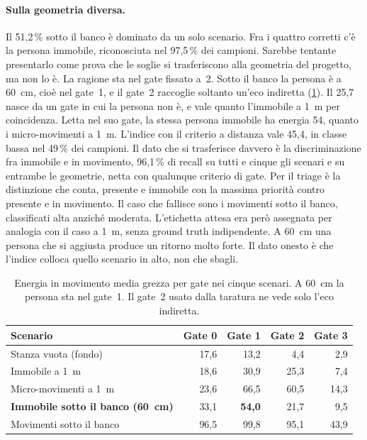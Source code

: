 \paragraph{Sulla geometria diversa.} Il 51,2\,\% sotto il banco è dominato da un
solo scenario. Fra i quattro corretti c'è la persona immobile, riconosciuta nel
97,5\,\% dei campioni. Sarebbe tentante presentarlo come prova che le soglie si
trasferiscono alla geometria del progetto, ma non lo è. La ragione sta nel gate
fissato a~2. Sotto il banco la persona è a 60~cm, cioè nel gate~1, e il gate~2
raccoglie soltanto un'eco indiretta (\cref{tab:vitalita-gate}). Il 25,7 nasce da un
gate in cui la persona non è, e vale quanto l'immobile a 1~m per coincidenza. Letta
nel suo gate, la stessa persona immobile ha energia 54, quanto i micro-movimenti a
1~m. L'indice con il criterio a distanza vale 45,4, in classe bassa nel 49\,\% dei
campioni. Il dato che si trasferisce davvero è la discriminazione fra immobile e in
movimento, 96,1\,\% di recall su tutti e cinque gli scenari e su entrambe le
geometrie, netta con qualunque criterio di gate. Per il triage è la distinzione che
conta, presente e immobile con la massima priorità contro presente e in movimento.
Il caso che fallisce sono i movimenti sotto il banco, classificati alta anziché
moderata. L'etichetta attesa era però assegnata per analogia con il caso a 1~m, senza
ground truth indipendente. A 60~cm una persona che si aggiusta produce un ritorno
molto forte. Il dato onesto è che l'indice colloca quello scenario in alto, non che
sbagli.

\begin{table}[htbp]
\centering
\caption{Energia in movimento media grezza per gate nei cinque scenari. A 60~cm la
persona sta nel gate~1. Il gate~2 usato dalla taratura ne vede solo l'eco indiretta.}
\label{tab:vitalita-gate}
\small
\begin{tabular}{@{}lrrrr@{}}
\toprule
Scenario & Gate 0 & Gate 1 & Gate 2 & Gate 3 \\
\midrule
Stanza vuota (fondo) & 17,6 & 13,2 & 4,4 & 2,9 \\
Immobile a 1~m & 18,6 & 30,9 & 25,3 & 7,4 \\
Micro-movimenti a 1~m & 23,6 & 66,5 & 60,5 & 14,3 \\
\textbf{Immobile sotto il banco (60~cm)} & 33,1 & \textbf{54,0} & 21,7 & 9,5 \\
Movimenti sotto il banco & 96,5 & 99,8 & 95,1 & 43,9 \\
\bottomrule
\end{tabular}
\end{table}

